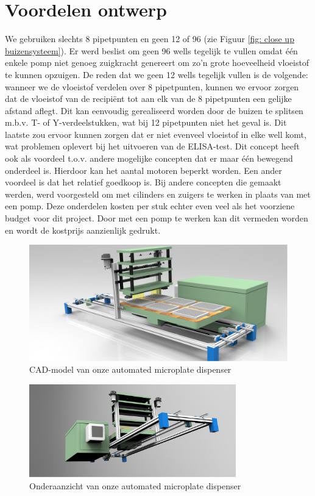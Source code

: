 \documentclass[a4paper,twoside,kulak]{kulakreport} %
\begin{document}
\section{Voordelen ontwerp}
	We gebruiken slechts 8 pipetpunten en geen 12 of 96 (zie Figuur \ref{fig: close up buizensysteem}). Er werd beslist om geen 96 wells tegelijk te vullen omdat één enkele pomp niet genoeg zuigkracht genereert om zo'n grote hoeveelheid vloeistof te kunnen opzuigen. De reden dat we geen 12 wells tegelijk vullen is de volgende: wanneer we de vloeistof verdelen over 8 pipetpunten, kunnen we ervoor zorgen dat de vloeistof van de recipiënt tot aan elk van de 8 pipetpunten een gelijke afstand aflegt. Dit kan eenvoudig gerealiseerd worden door de buizen te splitsen m.b.v. T- of Y-verdeelstukken, wat bij 12 pipetpunten niet het geval is. Dit laatste zou ervoor kunnen zorgen dat er niet evenveel vloeistof in elke well komt, wat problemen oplevert bij het uitvoeren van de ELISA-test. Dit concept heeft ook als voordeel t.o.v. andere mogelijke concepten dat er maar één bewegend onderdeel is. Hierdoor kan het aantal motoren beperkt worden. Een ander voordeel is dat het relatief goedkoop is. Bij andere concepten die gemaakt werden, werd voorgesteld om met cilinders en zuigers te werken in plaats van met een pomp. Deze onderdelen kosten per stuk echter even veel als het voorziene budget voor dit project. Door met een pomp te werken kan dit vermeden worden en wordt de kostprijs aanzienlijk gedrukt. 
	
\begin{figure}[h]
	\centering
	\includegraphics[width=\textwidth]{renderingBovenaan.png}
	\caption{CAD-model van onze automated microplate dispenser}
	\label{fig: CAD-model bovenaan}
	
\end{figure} 

\begin{figure}[h]
	\centering
	\includegraphics[width=0.8\textwidth]{renderingOnderaan.png}
	\caption{Onderaanzicht van onze automated microplate dispenser}
	\label{fig: CAD-model onderaan}
	
\end{figure} 
\end{document}
